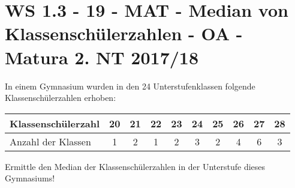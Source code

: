 \section{WS 1.3 - 19 - MAT - Median von Klassenschülerzahlen - OA - Matura 2. NT 2017/18}

\begin{beispiel}[WS 1.3]{1}
In einem Gymnasium wurden in den 24 Unterstufenklassen folgende Klassenschülerzahlen erhoben:\leer


\begin{center}
\begin{tabular}{|l|c|c|c|c|c|c|c|c|c|}\hline
\cellcolor{black!20} Klassenschülerzahl & 20 & 21 & 22 & 23 & 24 & 25 & 26 & 27 & 28 \\ \hline
\cellcolor{black!20} Anzahl der Klassen &1&2&1&2&3&2&4&6&3 \\ \hline
\end{tabular}
\end{center}

Ermittle den Median der Klassenschülerzahlen in der Unterstufe dieses Gymnasiums!

\end{beispiel}